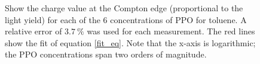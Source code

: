 \documentclass{JINST}
\begin{document}
\begin{figure}[tbh]
        \begin{center}
\caption[]{Show the charge value at the Compton edge (proportional to the light yield) for each of the 6 concentrations of PPO for toluene. A relative error of $3.7~\%$ was used for each measurement. The red lines show the fit of equation \ref{fit_eq}. Note that the x-axis is logarithmic; the PPO concentrations span two orders of magnitude. %
  \label{Toluene_ChargeResults_fig}}
        \end{center}
\end{figure}
\end{document}
